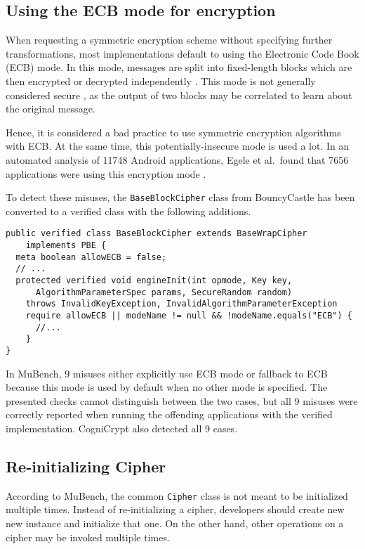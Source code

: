 \documentclass{article}
\newcommand{\etal}{et al.\ }
\begin{document}
\subsection{Using the ECB mode for encryption}\label{sec:MuBench:ECB}

When requesting a symmetric encryption scheme without specifying further transformations,
most implementations default to using the Electronic Code Book (ECB) mode.
In this mode, messages are split into fixed-length blocks which are then encrypted or
decrypted independently \cite{applied_crypto}.
This mode is not generally considered secure \cite{EBCinsecure}, as the output of two blocks may
be correlated to learn about the original message.

Hence, it is considered a bad practice to use symmetric encryption algorithms with ECB.
At the same time, this potentially-insecure mode is used a lot.
In an automated analysis of \num{11748} Android applications, Egele \etal found that \num{7656}
applications were using this encryption mode \cite{cryptolint}.

To detect these misuses, the \texttt{BaseBlockCipher} class from BouncyCastle has been converted
to a verified class with the following additions.

\begin{lstlisting}[style=jGuard]
public verified class BaseBlockCipher extends BaseWrapCipher
    implements PBE {
  meta boolean allowECB = false;
  // ...
  protected verified void engineInit(int opmode, Key key, 
      AlgorithmParameterSpec params, SecureRandom random)
    throws InvalidKeyException, InvalidAlgorithmParameterException
    require allowECB || modeName != null && !modeName.equals("ECB") {
      //...
    }
}
\end{lstlisting}

In MuBench, \num{9} misuses either explicitly use ECB mode or fallback to ECB because this mode
is used by default when no other mode is specified.
The presented checks cannot distinguish between the two cases, but all \num{9} misuses were correctly
reported when running the offending applications with the verified implementation.
CogniCrypt also detected all \num{9} cases.

\subsection{Re-initializing Cipher}\label{sec:Crypto:ReInitCipher}

According to MuBench, the common \texttt{Cipher} class is not meant to be initialized multiple times.
Instead of re-initializing a cipher, developers should create new new instance
and initialize that one.
On the other hand, other operations on a cipher may be invoked multiple times.
\end{document}
